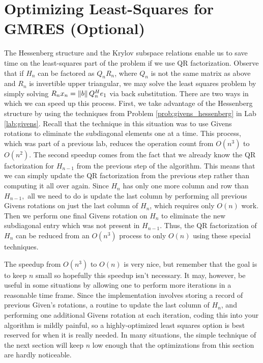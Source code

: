 \section*{Optimizing Least-Squares for GMRES (Optional)}
The Hessenberg structure and the Krylov subspace relations enable us to save time on the least-squares part of the problem if we use QR factorization.
Observe that if $H_n$ can be factored as $Q_n R_n$, where $Q_n$ is not the same matrix as above and $R_n$ is invertible upper triangular, we may solve the least squares problem by simply solving $R_n x_n=\left\lVert b\right\rVert Q_{n}^{H}e_1$ via back substitution.
There are two ways in which we can speed up this process.
First, we take advantage of the Hessenberg structure by using the techniques from Problem \ref{prob:givens_hessenberg} in Lab \ref{lab:givens}.
Recall that the technique in this situation was to use Givens rotations to eliminate the subdiagonal elements one at a time.
This process, which was part of a previous lab, reduces the operation count from $O(n^3)$ to $O(n^2)$.
The second speedup comes from the fact that we already know the QR factorization for $H_{n-1}$ from the previous step of the algorithm.
This means that we can simply update the QR factorization from the previous step rather than computing it all over again.
Since $H_{n}$ has only one more column and row than $H_{n-1},$ all we need to do is update the last column by performing all previous Givens rotations on just the last column of $H_n$, which requires only $O(n)$ work.
Then we perform one final Givens rotation on $H_n$ to eliminate the new subdiagonal entry which was not present in $H_{n-1}$.
Thus, the QR factorization of $H_n$ can be reduced from an $O(n^3)$ process to only $O(n)$ using these special techniques.

The speedup from $O(n^3)$ to $O(n)$ is very nice, but remember that the goal is to keep $n$ small so hopefully this speedup isn't necessary.
It may, however, be useful in some situations by allowing one to perform more iterations in a reasonable time frame.
Since the implementation involves storing a record of previous Given's rotations, a routine to update the last column of $H_n$, and performing one additional Givens rotation at each iteration, coding this into your algorithm is mildly painful, so a highly-optimized least squares option is best reserved for when it is really needed.
In many situations, the simple technique of the next section will keep $n$ low enough that the optimizations from this section are hardly noticeable.
%


